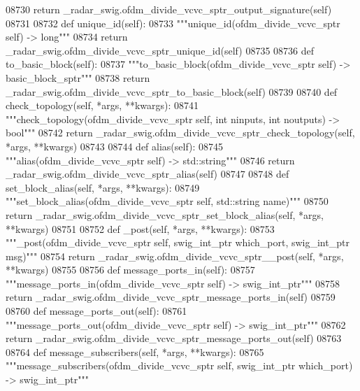 \begin{DoxyCode}
{{{{{{{{{{{{{{{{{{{{{{{{{{{{08730         \textcolor{keywordflow}{return} \_radar\_swig.ofdm\_divide\_vcvc\_sptr\_output\_signature(self)
08731 
08732     \textcolor{keyword}{def }unique_id(self):
08733         \textcolor{stringliteral}{"""unique\_id(ofdm\_divide\_vcvc\_sptr self) -> long"""}
08734         \textcolor{keywordflow}{return} \_radar\_swig.ofdm\_divide\_vcvc\_sptr\_unique\_id(self)
08735 
08736     \textcolor{keyword}{def }to_basic_block(self):
08737         \textcolor{stringliteral}{"""to\_basic\_block(ofdm\_divide\_vcvc\_sptr self) -> basic\_block\_sptr"""}
08738         \textcolor{keywordflow}{return} \_radar\_swig.ofdm\_divide\_vcvc\_sptr\_to\_basic\_block(self)
08739 
08740     \textcolor{keyword}{def }check_topology(self, *args, **kwargs):
08741         \textcolor{stringliteral}{"""check\_topology(ofdm\_divide\_vcvc\_sptr self, int ninputs, int noutputs) -> bool"""}
08742         \textcolor{keywordflow}{return} \_radar\_swig.ofdm\_divide\_vcvc\_sptr\_check\_topology(self, *args, **kwargs)
08743 
08744     \textcolor{keyword}{def }alias(self):
08745         \textcolor{stringliteral}{"""alias(ofdm\_divide\_vcvc\_sptr self) -> std::string"""}
08746         \textcolor{keywordflow}{return} \_radar\_swig.ofdm\_divide\_vcvc\_sptr\_alias(self)
08747 
08748     \textcolor{keyword}{def }set_block_alias(self, *args, **kwargs):
08749         \textcolor{stringliteral}{"""set\_block\_alias(ofdm\_divide\_vcvc\_sptr self, std::string name)"""}
08750         \textcolor{keywordflow}{return} \_radar\_swig.ofdm\_divide\_vcvc\_sptr\_set\_block\_alias(self, *args, **kwargs)
08751 
08752     \textcolor{keyword}{def }_post(self, *args, **kwargs):
08753         \textcolor{stringliteral}{"""\_post(ofdm\_divide\_vcvc\_sptr self, swig\_int\_ptr which\_port, swig\_int\_ptr msg)"""}
08754         \textcolor{keywordflow}{return} \_radar\_swig.ofdm\_divide\_vcvc\_sptr\_\_post(self, *args, **kwargs)
08755 
08756     \textcolor{keyword}{def }message_ports_in(self):
08757         \textcolor{stringliteral}{"""message\_ports\_in(ofdm\_divide\_vcvc\_sptr self) -> swig\_int\_ptr"""}
08758         \textcolor{keywordflow}{return} \_radar\_swig.ofdm\_divide\_vcvc\_sptr\_message\_ports\_in(self)
08759 
08760     \textcolor{keyword}{def }message_ports_out(self):
08761         \textcolor{stringliteral}{"""message\_ports\_out(ofdm\_divide\_vcvc\_sptr self) -> swig\_int\_ptr"""}
08762         \textcolor{keywordflow}{return} \_radar\_swig.ofdm\_divide\_vcvc\_sptr\_message\_ports\_out(self)
08763 
08764     \textcolor{keyword}{def }message_subscribers(self, *args, **kwargs):
08765         \textcolor{stringliteral}{"""message\_subscribers(ofdm\_divide\_vcvc\_sptr self, swig\_int\_ptr which\_port) -> swig\_int\_ptr"""}
}}}}}}}}}}}}}}}}}}}}}}}}}}}}
\end{DoxyCode}
